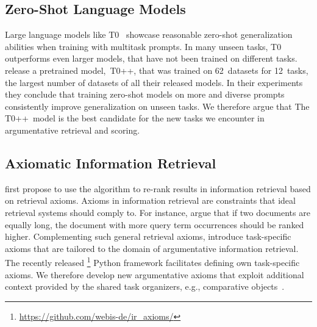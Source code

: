 \subsection{Zero-Shot Language Models}

Large language models like T0~\cite{SanhWRBSACSLRDBXTSSKCNDCJWMSYPBWNRSSFFTBGBWR2021} showcase reasonable zero-shot generalization abilities when training with multitask prompts.
In many unseen tasks, T0 outperforms even larger models, that have not been trained on different tasks.
\citet{SanhWRBSACSLRDBXTSSKCNDCJWMSYPBWNRSSFFTBGBWR2021} release a pretrained model,~T0++, that was trained on 62~datasets for 12~tasks, the largest number of datasets of all their released models.
In their experiments they conclude that training zero-shot models on more and diverse prompts consistently improve generalization on unseen tasks.
We therefore argue that The T0++~model is the best candidate for the new tasks we encounter in argumentative retrieval and scoring.

\subsection{Axiomatic Information Retrieval}

\citet{HagenVGS2016} first propose to use the \KwikSort algorithm to re-rank results in information retrieval based on retrieval axioms.
Axioms in information retrieval are constraints that ideal retrieval systems should comply to.
For instance, \citet{FangTZ2004} argue that if two documents are equally long, the document with more query term occurrences should be ranked higher.
Complementing such general retrieval axioms, \citet{BondarenkoHVSPB2018} introduce task-specific axioms that are tailored to the domain of argumentative information retrieval.
The recently released \iraxioms\footnote{\url{https://github.com/webis-de/ir_axioms/}} Python framework facilitates defining own task-specific axioms.
We therefore develop new argumentative axioms that exploit additional context provided by the shared task organizers, e.g., comparative objects~\cite{BondarenkoFKSGBPBSWPH2022}.
